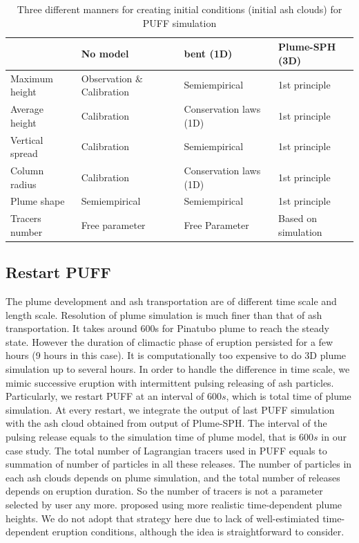 \begin{table}
\centering
      \caption{Three different manners for creating initial conditions (initial ash clouds) for PUFF simulation}		
	  \begin{tabular}{p{33mm}p{32mm}p{32mm}p{32mm}}
	    \hline
	    		 & No model & bent (1D) & Plume-SPH \newline (3D) \\
	    		 \hline    		 
	  Maximum height & Observation $\&$ \newline Calibration & Semiempirical &  1st principle \\
	  Average height &  Calibration & Conservation \newline laws (1D) &  1st principle  \\
	  Vertical spread &  Calibration & Semiempirical & 1st principle \\
	  Column radius & Calibration  &  Conservation \newline laws (1D) &  1st principle \\
	  Plume shape & Semiempirical & Semiempirical  & 1st principle \\
	  Tracers number & Free \newline parameter  & Free \newline Parameter & Based on \newline simulation\\ 
	    \hline
	  \end{tabular}
	  \label{tab:VATDs-source-term-determination}
\end{table}

\subsection{Restart PUFF}

The plume development and ash transportation are of different time scale and length scale. Resolution of plume simulation is much finer than that of ash transportation.
It takes around 600s for Pinatubo plume to reach the steady state. However the duration of climactic phase of eruption persisted for a few hours (9 hours in this case). It is computationally too expensive to do 3D plume simulation up to several hours. In order to handle the difference in time scale, we mimic successive eruption with intermittent pulsing releasing of ash particles. Particularly, we restart PUFF at an interval of $600 s$, which is total time of plume simulation. At every restart, we integrate the output of last PUFF simulation with the ash cloud obtained from output of Plume-SPH. The interval of the pulsing release equals to the simulation time of plume model, that is $600 s$ in our case study. The total number of Lagrangian tracers used in PUFF equals to summation of number of particles in all these releases. The number of particles in each ash clouds depends on plume simulation, and the total number of releases depends on eruption duration. So the number of tracers is not a parameter selected by user any more.
\citet{fero2008simulation} proposed using more realistic time-dependent plume heights. We do not adopt that strategy here due to lack of well-estimiated time-dependent eruption conditions, although the idea is straightforward to consider.

